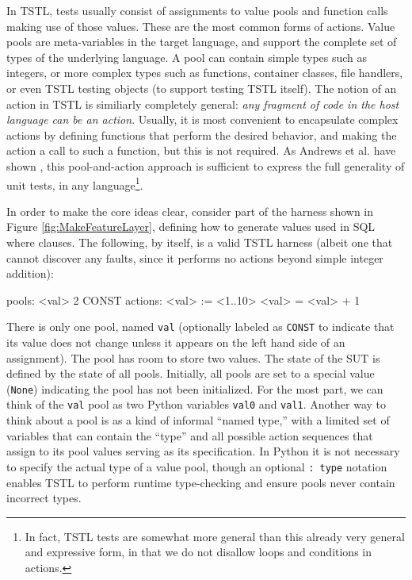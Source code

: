 In TSTL, tests usually consist of assignments to value pools and
function calls making use of those values.  These are the most common
forms of actions.  Value pools are meta-variables in the target
language, and support the complete set of types of the underlying
language.  A pool can contain simple types such as integers, or more
complex types such as functions, container classes, file handlers, or
even TSTL testing objects (to support testing TSTL itself).  The
notion of an action in TSTL is similiarly completely general:
\emph{any fragment of code in the host language can be an action}.
Usually, it is most convenient to encapsulate complex actions by
defining functions that perform the desired behavior, and making the
action a call to such a function, but this is not required.  As
Andrews et al. have shown \cite{AndrewsTR}, this pool-and-action approach is
sufficient to express the full generality of unit tests, in any
language\footnote{In fact, TSTL tests are somewhat more general than
  this already very general and expressive form, in that we do not
  disallow loops and conditions in actions.}.

In order to make the core ideas clear,
consider part of the harness shown in Figure \ref{fig:MakeFeatureLayer}, defining how to
generate values used in SQL where clauses.  The following, by itself,
is a valid TSTL harness (albeit one that cannot discover any
faults, since it performs no actions beyond simple integer addition):

{\scriptsize
\begin{code}
pools:
  <val> 2 CONST
\vspace{0.05in}
actions:
\vspace{0.05in}
<val> := <1..10>
<val> = <val> + 1
\end{code}
}

There is only one pool, named {\tt val} (optionally labeled as {\tt CONST} to
indicate that its value does not change unless it appears on the left
hand side of an assignment).  The pool has room to store
two values.  The state of the SUT is defined by the state of all
pools.  Initially, all pools are set to a special value ({\tt None}) indicating the
pool has not been initialized.  For the most part, we can think of the
{\tt val} pool as two Python variables {\tt val0} and {\tt val1}.  Another
way to think about a pool is as a kind of informal ``named type,''
with a limited set of variables that can contain the ``type'' and all
possible action sequences that assign to its pool values serving as
its specification.  In Python it is not necessary to specify the
actual type
of a value pool, though an optional {\tt : type} notation enables TSTL
to perform runtime type-checking and ensure pools never contain
incorrect types.

